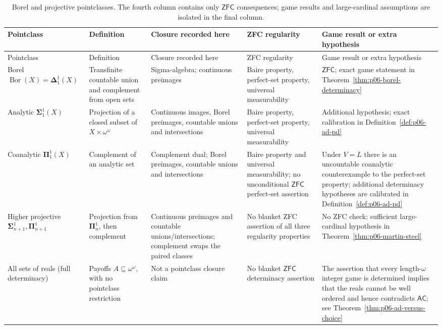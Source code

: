 \begin{landscape}
\begingroup\footnotesize
\setlength{\tabcolsep}{4pt}
\begin{longtable}{@{}p{.13\linewidth}p{.20\linewidth}p{.20\linewidth}
  p{.24\linewidth}p{.17\linewidth}@{}}
\caption{Borel and projective pointclasses.  The fourth
column contains only \(\mathsf{ZFC}\) consequences; game results and
large-cardinal assumptions are isolated in the final column.}
\label{tab:p06-borel-projective}\\
\toprule
Pointclass & Definition & Closure recorded here & ZFC regularity &
Game result or extra hypothesis \\
\midrule
\endfirsthead
\toprule
Pointclass & Definition & Closure recorded here & ZFC regularity &
Game result or extra hypothesis \\
\midrule
\endhead
Borel
\(\operatorname{Bor}(X)=\boldsymbol{\Delta}^{1}_{1}(X)\) &
Transfinite countable union and complement from open sets &
Sigma-algebra; continuous preimages &
Baire property, perfect-set property, universal measurability &
\(\mathsf{ZFC}\); exact game statement in
Theorem~\ref{thm:p06-borel-determinacy} \\
Analytic
\(\boldsymbol{\Sigma}^{1}_{1}(X)\) &
Projection of a closed subset of \(X\times\omega^\omega\) &
Continuous images, Borel preimages, countable unions and intersections &
Baire property, perfect-set property, universal measurability &
Additional hypothesis; exact calibration in
Definition~\ref{def:p06-ad-pd} \\
Coanalytic
\(\boldsymbol{\Pi}^{1}_{1}(X)\) &
Complement of an analytic set &
Complement dual; Borel preimages, countable unions and intersections &
Baire property and universal measurability; no unconditional
\(\mathsf{ZFC}\) perfect-set assertion &
Under \(V=L\) there is an uncountable coanalytic counterexample to the
perfect-set property; additional determinacy hypotheses are calibrated in
Definition~\ref{def:p06-ad-pd} \\
Higher projective
\(\boldsymbol{\Sigma}^{1}_{n+1},
 \boldsymbol{\Pi}^{1}_{n+1}\) &
Projection from \(\boldsymbol{\Pi}^{1}_{n}\), then complement &
Continuous preimages and countable unions/intersections; complement swaps
the paired classes &
No blanket ZFC assertion of all three regularity properties &
No ZFC check; sufficient large-cardinal hypothesis in
Theorem~\ref{thm:p06-martin-steel} \\
All sets of reals (full determinacy) &
Payoffs \(A\subseteq\omega^\omega\), with no pointclass restriction &
Not a pointclass closure claim &
No blanket \(\mathsf{ZFC}\) determinacy assertion &
The assertion that every length-\(\omega\) integer game is determined implies
that the reals cannot be well ordered and hence contradicts
\(\mathsf{AC}\); see Theorem~\ref{thm:p06-ad-versus-choice} \\
\bottomrule
\end{longtable}
\endgroup
\end{landscape}
\thispagestyle{empty}%

